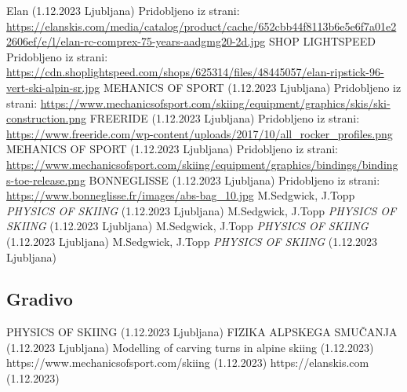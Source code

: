 \documentclass{article}
\begin{document}
\begin{thebibliography}{20}
      Elan (1.12.2023 Ljubljana) Pridobljeno iz strani: \url{https://elanskis.com/media/catalog/product/cache/652cbb44f8113b6e5e6f7a01e22606ef/e/l/elan-rc-comprex-75-years-aadgmg20-2d.jpg}
     SHOP LIGHTSPEED Pridobljeno iz strani: \url{https://cdn.shoplightspeed.com/shops/625314/files/48445057/elan-ripstick-96-vert-ski-alpin-sr.jpg}
     MEHANICS OF SPORT (1.12.2023 Ljubljana) Pridobljeno iz strani: \url{https://www.mechanicsofsport.com/skiing/equipment/graphics/skis/ski-construction.png}
     FREERIDE (1.12.2023 Ljubljana) Pridobljeno iz strani: \url{https://www.freeride.com/wp-content/uploads/2017/10/all_rocker_profiles.png} 
     MEHANICS OF SPORT (1.12.2023 Ljubljana) Pridobljeno iz strani: \url{https://www.mechanicsofsport.com/skiing/equipment/graphics/bindings/bindings-toe-release.png}
     BONNEGLISSE (1.12.2023 Ljubljana) Pridobljeno iz strani: \url{https://www.bonneglisse.fr/images/abs-bag_10.jpg}
     M.Sedgwick, J.Topp \emph{PHYSICS OF SKIING} (1.12.2023 Ljubljana)
     M.Sedgwick, J.Topp \emph{PHYSICS OF SKIING} (1.12.2023 Ljubljana)
     M.Sedgwick, J.Topp \emph{PHYSICS OF SKIING} (1.12.2023 Ljubljana)
     M.Sedgwick, J.Topp \emph{PHYSICS OF SKIING} (1.12.2023 Ljubljana)
\end{thebibliography}


\subsection{Gradivo}

\begin{thebibliography}{widestlabel} 
     PHYSICS OF SKIING (1.12.2023 Ljubljana)
    \bibitem[P.Fakin]{} FIZIKA ALPSKEGA SMUČANJA (1.12.2023 Ljubljana)
     Modelling of carving turns in alpine skiing (1.12.2023)
     https://www.mechanicsofsport.com/skiing (1.12.2023)
    \bibitem[ELAN]{}  https://elanskis.com (1.12.2023)
    
\end{thebibliography}
\end{document}

